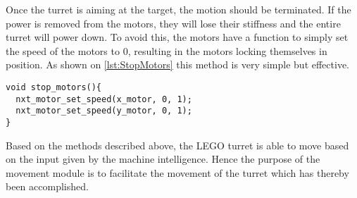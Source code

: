 Once the turret is aiming at the target, the motion should be terminated.
If the power is removed from the motors, they will lose their stiffness and the entire turret will power down.
To avoid this, the motors have a function to simply set the speed of the motors to $0$, resulting in the motors locking themselves in position.
As shown on \autoref{lst:StopMotors} this method is very simple but effective.
\begin{lstlisting}[language=CSharp,label={lst:StopMotors},caption={stop\_motors method from movement.c}]
void stop_motors(){
  nxt_motor_set_speed(x_motor, 0, 1);
  nxt_motor_set_speed(y_motor, 0, 1);
}
\end{lstlisting}

Based on the methods described above, the LEGO turret is able to move based on the input given by the machine intelligence.
Hence the purpose of the movement module is to facilitate the movement of the turret which has thereby been accomplished.

